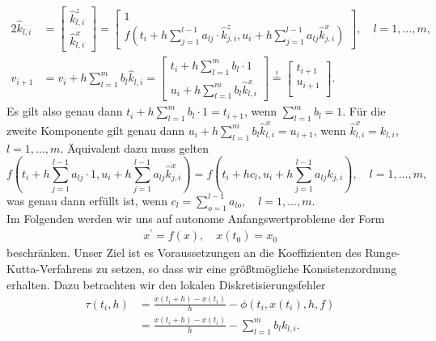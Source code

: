 \begin{alignat*}{2}
    \hat{k}_{l,i} &= \begin{bmatrix} \hat{k}^{z}_{l,i} \\ \hat{k}^{x}_{l,i} \end{bmatrix}
    = \begin{bmatrix} 1 \\
    f\left( t_i + h \sum\limits_{j=1}^{l-1} a_{lj} \cdot \hat{k}^{z}_{j,i},
    u_i + h \sum\limits_{j=1}^{l-1} a_{lj} \hat{k}^{x}_{j,i} \right)
    \end{bmatrix},  \quad l=1,\dots,m, \\
    v_{i+1} &= v_i + h \sum\limits_{l=1}^{m} b_l \hat{k}_{l,i} = \begin{bmatrix}
                                                                     t_i + h \sum\limits_{l=1}^{m} b_l \cdot 1\\
                                                                     u_i + h \sum\limits_{l=1}^{m} b_l \hat{k}^{x}_{l,i}
    \end{bmatrix}
    \overset{!}{=}\begin{bmatrix}t_{i+1}\\u_{i+1}\\\end{bmatrix}.
\end{alignat*}
Es gilt also genau dann $t_i + h \sum\limits_{l=1}^{m} b_l \cdot 1 = t_{i+1}$, wenn $\sum\limits_{l=1}^{m} b_l = 1$.
Für die zweite Komponente gilt genau dann $u_i + h \sum\limits_{l=1}^{m} b_l \hat{k}^{x}_{l,i} = u_{i+1}$,
wenn $\hat{k}^{x}_{l,i} = k_{l,i}$, $l = 1, \dots, m$. Äquivalent dazu muss gelten
\[
    f\left( t_i + h \sum\limits_{j=1}^{l-1} a_{lj} \cdot 1,
    u_i + h \sum\limits_{j=1}^{l-1} a_{lj} \hat{k}^{x}_{j,i} \right)
    = f\left( t_i +hc_l, u_i + h \sum_{j=1}^{l-1} a_{lj} k_{j,i} \right), \quad l = 1, \dots, m,
\]
was genau dann erfüllt ist, wenn $c_l = \sum\limits_{o=1}^{l-1} a_{lo}, \quad l= 1, \dots, m.$ \qedwhite\\
Im Folgenden werden wir uns auf autonome Anfangswertprobleme der Form
\begin{align}
    x^{\prime} = f(x), \quad x(t_0) = x_0   \label{eq:9}
\end{align}
beschränken. Unser Ziel ist es Voraussetzungen an die Koeffizienten des Runge-Kutta-Verfahrens zu setzen, so dass wir eine
größtmögliche Konsistenzordnung erhalten. Dazu betrachten wir den lokalen Diskretisierungsfehler
\begin{align}
    \tau (t_i,h) &= \frac{x(t_i + h) - x(t_i)}{h} - \phi(t_i, x(t_i), h, f) \nonumber \\
    &= \frac{x(t_i + h) - x(t_i)}{h} - \sum_{l=1}^{m} b_l k_{l,i}.  \label{eq:kon_auto}
\end{align}
